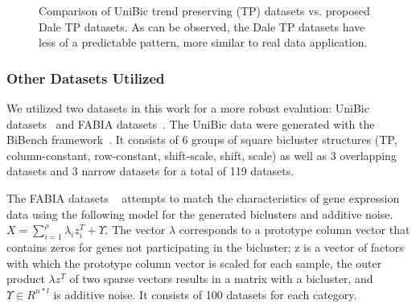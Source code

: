 \begin{figure}[t]
    \centering
    \qquad
    \qquad
    \caption{
        Comparison of UniBic trend preserving (TP) datasets vs. proposed Dale TP datasets. As can be observed, the Dale TP datasets have less of a predictable pattern, more similar to real data application.
    }
    \label{fig:biclustermodels}
\end{figure}

\subsubsection*{Other Datasets Utilized}
We utilized two datasets in this work for a more robust evalution: UniBic datasets~\cite{wang2016unibic} and FABIA datasets~\cite{hochreiter2010fabia}. 
The UniBic data were generated with the BiBench framework~\cite{eren2012comparative}.
It consists of 6 groups of square bicluster structures (TP, column-constant, row-constant, shift-scale, shift, scale) as well as 3 overlapping datasets and 3 narrow datasets for a total of 119 datasets.

The FABIA datasets ~\cite{hochreiter2010fabia} attempts to match the characteristics of gene expression data using the following model for the generated  biclusters and additive noise. $
	X =  \sum_{i=1}^{\rho }\lambda_{i} z_{i}^{T} +\Upsilon.
$
The vector $\lambda$ corresponds
to a prototype column vector that contains zeros for genes not participating in the bicluster; z is a vector of factors with which the prototype column vector is scaled for each sample, the outer product $\lambda z_{}^{T}$ of two sparse vectors results in a matrix with a bicluster, and $\Upsilon \in R^{n*l}$ is additive noise. It consists of 100 datasets for each category.

